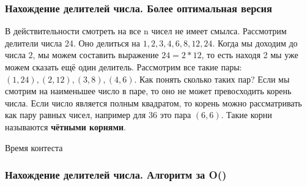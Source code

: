 
\begin{frame}[fragile]
	\frametitle{Нахождение делителей числа. Более оптимальная версия}

    \quad В действительности смотреть на все n чисел не имеет смылса. Рассмотрим делители числа 24. Оно делиться на $1, 2, 3, 4, 6, 8, 12, 24$. Когда мы доходим до числа $2$, мы можем составить выражение $24=2*12$, то есть находя 2 мы уже можем сказать ещё один делитель. Рассмотрим все такие пары: $(1,24),(2,12),(3,8),(4,6)$. Как понять сколько таких пар? Если мы смотрим на наименьшее число в паре, то оно не может превосходить корень числа. Если число является полным квадратом, то корень можно рассматривать как пару равных чисел, например для $36$ это пара $(6,6)$. Такие корни называются \textbf{чётными корнями}.
    
\end{frame}


\begin{frame}
    \center \Huge Время контеста 
\end{frame}



\begin{frame}[fragile]
	\frametitle{Нахождение делителей числа. Алгоритм за O()}


\end{frame}
